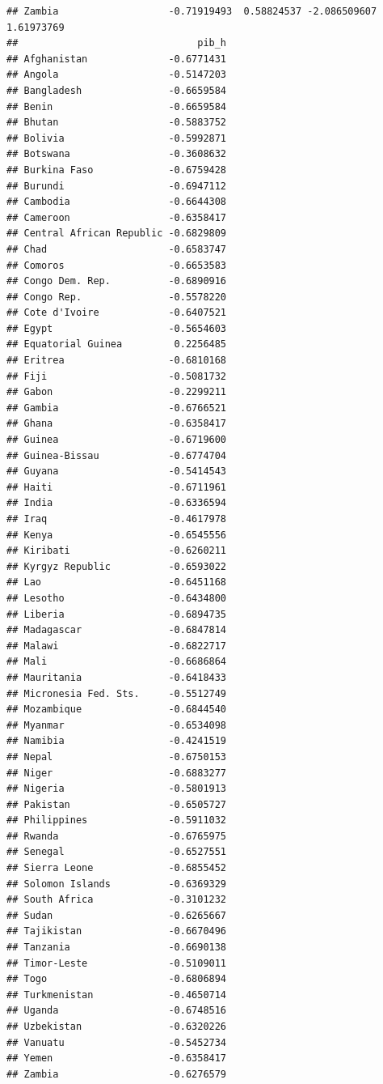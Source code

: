 \documentclass[
]{article}
\begin{document}
\begin{verbatim}
## Zambia                   -0.71919493  0.58824537 -2.086509607  1.61973769
##                               pib_h
## Afghanistan              -0.6771431
## Angola                   -0.5147203
## Bangladesh               -0.6659584
## Benin                    -0.6659584
## Bhutan                   -0.5883752
## Bolivia                  -0.5992871
## Botswana                 -0.3608632
## Burkina Faso             -0.6759428
## Burundi                  -0.6947112
## Cambodia                 -0.6644308
## Cameroon                 -0.6358417
## Central African Republic -0.6829809
## Chad                     -0.6583747
## Comoros                  -0.6653583
## Congo Dem. Rep.          -0.6890916
## Congo Rep.               -0.5578220
## Cote d'Ivoire            -0.6407521
## Egypt                    -0.5654603
## Equatorial Guinea         0.2256485
## Eritrea                  -0.6810168
## Fiji                     -0.5081732
## Gabon                    -0.2299211
## Gambia                   -0.6766521
## Ghana                    -0.6358417
## Guinea                   -0.6719600
## Guinea-Bissau            -0.6774704
## Guyana                   -0.5414543
## Haiti                    -0.6711961
## India                    -0.6336594
## Iraq                     -0.4617978
## Kenya                    -0.6545556
## Kiribati                 -0.6260211
## Kyrgyz Republic          -0.6593022
## Lao                      -0.6451168
## Lesotho                  -0.6434800
## Liberia                  -0.6894735
## Madagascar               -0.6847814
## Malawi                   -0.6822717
## Mali                     -0.6686864
## Mauritania               -0.6418433
## Micronesia Fed. Sts.     -0.5512749
## Mozambique               -0.6844540
## Myanmar                  -0.6534098
## Namibia                  -0.4241519
## Nepal                    -0.6750153
## Niger                    -0.6883277
## Nigeria                  -0.5801913
## Pakistan                 -0.6505727
## Philippines              -0.5911032
## Rwanda                   -0.6765975
## Senegal                  -0.6527551
## Sierra Leone             -0.6855452
## Solomon Islands          -0.6369329
## South Africa             -0.3101232
## Sudan                    -0.6265667
## Tajikistan               -0.6670496
## Tanzania                 -0.6690138
## Timor-Leste              -0.5109011
## Togo                     -0.6806894
## Turkmenistan             -0.4650714
## Uganda                   -0.6748516
## Uzbekistan               -0.6320226
## Vanuatu                  -0.5452734
## Yemen                    -0.6358417
## Zambia                   -0.6276579
\end{verbatim}
\end{document}
